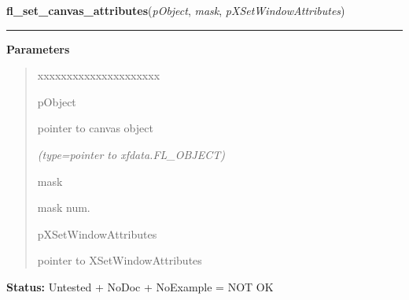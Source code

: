 \hspace{.8\funcindent}\begin{boxedminipage}{\funcwidth}

    \raggedright \textbf{fl\_set\_canvas\_attributes}(\textit{pObject}, \textit{mask}, \textit{pXSetWindowAttributes})

    \vspace{-1.5ex}

    \rule{\textwidth}{0.5\fboxrule}
\setlength{\parskip}{2ex}
\setlength{\parskip}{1ex}
      \textbf{Parameters}
      \vspace{-1ex}

      \begin{quote}
        \begin{Ventry}{xxxxxxxxxxxxxxxxxxxxx}

          \item[pObject]

          pointer to canvas object

            {\it (type=pointer to xfdata.FL\_OBJECT)}

          \item[mask]

          mask num.

          \item[pXSetWindowAttributes]

          pointer to XSetWindowAttributes

        \end{Ventry}

      \end{quote}

\textbf{Status:} Untested + NoDoc + NoExample = NOT OK



    \end{boxedminipage}

    \label{xformslib:library:fl_add_canvas_handler}

    \vspace{0.5ex}

